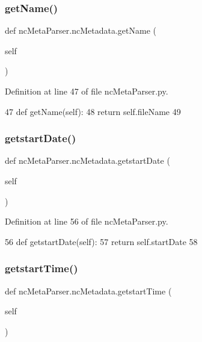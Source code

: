 \subsubsection{\texorpdfstring{get\+Name()}{getName()}}
{\footnotesize\ttfamily def nc\+Meta\+Parser.\+nc\+Metadata.\+get\+Name (\begin{DoxyParamCaption}\item[{}]{self }\end{DoxyParamCaption})}



Definition at line 47 of file nc\+Meta\+Parser.\+py.


\begin{DoxyCode}
47     \textcolor{keyword}{def }getName(self):
48         \textcolor{keywordflow}{return} self.fileName
49     
\end{DoxyCode}
\mbox{\label{classnc_meta_parser_1_1nc_metadata_a79b7ca324dcadb2f56066db1c663794a}} 
\subsubsection{\texorpdfstring{getstart\+Date()}{getstartDate()}}
{\footnotesize\ttfamily def nc\+Meta\+Parser.\+nc\+Metadata.\+getstart\+Date (\begin{DoxyParamCaption}\item[{}]{self }\end{DoxyParamCaption})}



Definition at line 56 of file nc\+Meta\+Parser.\+py.


\begin{DoxyCode}
56     \textcolor{keyword}{def }getstartDate(self):
57         \textcolor{keywordflow}{return} self.startDate
58     
\end{DoxyCode}
\mbox{\label{classnc_meta_parser_1_1nc_metadata_afe2e767476347158c9359cc8c5afef21}} 
\subsubsection{\texorpdfstring{getstart\+Time()}{getstartTime()}}
{\footnotesize\ttfamily def nc\+Meta\+Parser.\+nc\+Metadata.\+getstart\+Time (\begin{DoxyParamCaption}\item[{}]{self }\end{DoxyParamCaption})}



